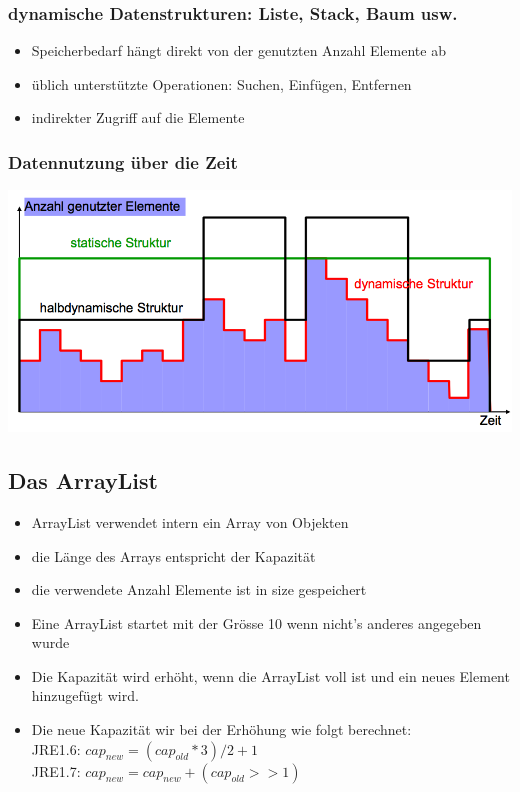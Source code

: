 \documentclass[a4paper,10pt]{article}
\begin{document}
\subsubsection{dynamische Datenstrukturen: Liste, Stack, Baum usw.}
\begin{itemize}
	\item Speicherbedarf h\"angt direkt von der genutzten Anzahl Elemente ab
	\item \"ublich unterst\"utzte Operationen: Suchen, Einf\"ugen, Entfernen
	\item indirekter Zugriff auf die Elemente
\end{itemize}

\subsubsection{Datennutzung \"uber die Zeit}
\includegraphics[width=150mm]{datennutzung_ueber_zeit.png}

\subsection{Das ArrayList}
\begin{itemize}
	\item ArrayList verwendet intern ein Array von Objekten
	\item die L\"ange des Arrays entspricht der Kapazit\"at
	\item die verwendete Anzahl Elemente ist in size gespeichert
	\item Eine ArrayList startet mit der Gr\"osse 10 wenn nicht's anderes angegeben wurde
	\item Die Kapazit\"at wird erh\"oht, wenn die ArrayList voll ist und ein neues Element hinzugef\"ugt wird.
	\item Die neue Kapazit\"at wir bei der Erh\"ohung wie folgt berechnet:\\
			JRE1.6: $cap_{new}=(cap_{old} * 3) / 2 + 1$\\
			JRE1.7: $cap_{new}=cap_{new} + (cap_{old} >> 1)$
\end{itemize}
\end{document}
